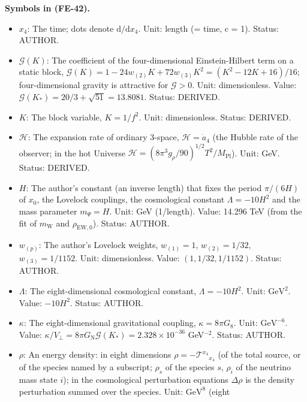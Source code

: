 \documentclass[
  10pt,
]{article}
\providecommand{\tightlist}{%
  \setlength{\itemsep}{0pt}\setlength{\parskip}{0pt}}
\begin{document}
\textbf{Symbols in (FE-42).}

\begin{itemize}
\tightlist
\item
  \(x_4\): The time; dots denote \(\mathrm{d}/\mathrm{d}x_4\). Unit:
  length (= time, c = 1). Status: AUTHOR.
\item
  \(\mathcal{G}(K)\): The coefficient of the four-dimensional
  Einstein-Hilbert term on a static block,
  \(\mathcal{G}(K) = 1 - 24w_{(2)}K + 72w_{(3)}K^2 = (K^2 - 12K + 16)/16\);
  four-dimensional gravity is attractive for \(\mathcal{G} > 0\). Unit:
  dimensionless. Value:
  \(\mathcal{G}(K_*) = 20/3 + \sqrt{51} = 13.8081\). Status: DERIVED.
\item
  \(K\): The block variable, \(K = 1/f^2\). Unit: dimensionless. Status:
  DERIVED.
\item
  \(\mathcal{H}\): The expansion rate of ordinary 3-space,
  \(\mathcal{H} = \dot a_4\) (the Hubble rate of the observer; in the
  hot Universe
  \(\mathcal{H} = (8\pi^3g_\rho/90)^{1/2}T^2/M_{\mathrm{Pl}}\)). Unit:
  GeV. Status: DERIVED.
\item
  \(H\): The author's constant (an inverse length) that fixes the period
  \(\pi/(6H)\) of \(x_0\), the Lovelock couplings, the cosmological
  constant \(\Lambda = -10H^2\) and the mass parameter \(m_\Psi = H\).
  Unit: GeV (1/length). Value: 14.296 TeV (from the fit of
  \(m_{\mathrm{W}}\) and \(\rho_{\mathrm{EW},0}\)). Status: AUTHOR.
\item
  \(w_{(p)}\): The author's Lovelock weights, \(w_{(1)} = 1\),
  \(w_{(2)} = 1/32\), \(w_{(3)} = 1/1152\). Unit: dimensionless. Value:
  \((1, 1/32, 1/1152)\). Status: AUTHOR.
\item
  \(\Lambda\): The eight-dimensional cosmological constant,
  \(\Lambda = -10H^2\). Unit: \(\mathrm{GeV}^{2}\). Value: \(-10H^2\).
  Status: AUTHOR.
\item
  \(\kappa\): The eight-dimensional gravitational coupling,
  \(\kappa = 8\pi G_8\). Unit: \(\mathrm{GeV}^{-6}\). Value:
  \(\kappa/V_\perp = 8\pi G_{\mathrm{N}}\mathcal{G}(K_*) = 2.328\times10^{-36}\)
  GeV\(^{-2}\). Status: AUTHOR.
\item
  \(\rho\): An energy density: in eight dimensions
  \(\rho = -\mathcal{T}^{x_4}{}_{x_4}\) (of the total source, or of the
  species named by a subscript; \(\rho_s\) of the species \(s\),
  \(\rho_i\) of the neutrino mass state \(i\)); in the cosmological
  perturbation equations \(\Delta\rho\) is the density perturbation
  summed over the species. Unit: \(\mathrm{GeV}^{8}\) (eight

\end{itemize}
\end{document}
